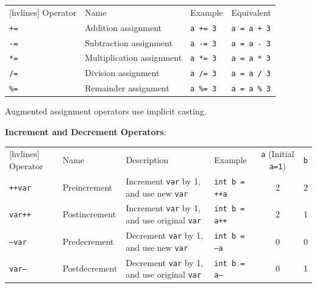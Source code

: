 \documentclass{article}
\begin{document}
\begin{table}[h]
	\centering
	\begin{NiceTabular}{||llll||}[hvlines]
		\RowStyle{\bfseries}Operator & Name & Example & Equivalent\\
		\texttt{+=} & Addition assignment & \texttt{a += 3} & \texttt{a = a + 3}\\
		\texttt{-=} & Subtraction assignment & \texttt{a -= 3} & \texttt{a = a - 3}\\
		\texttt{*=} & Multiplication assignment & \texttt{a *= 3} & \texttt{a = a * 3}\\
		\texttt{/=} & Division assignment & \texttt{a /= 3} & \texttt{a = a / 3}\\
		\texttt{\%=} & Remainder assignment & \texttt{a \%= 3} & \texttt{a = a \% 3}
	\end{NiceTabular}
\end{table}
Augmented assignment operators use implicit casting.
\newpage

\textbf{Increment and Decrement Operators}:

\begin{table}[h]
	\centering
	\begin{NiceTabular}{||llllcc||}[hvlines]
		\RowStyle{\bfseries} Operator & Name & Description & Example & \texttt{a} (Initial \texttt{a=1}) & \texttt{b}\\
		\texttt{++var} & Preincrement & Increment \texttt{var} by 1, and use new \texttt{var} & \texttt{int b = ++a} & 2 & 2\\
		\texttt{var++} & Postincrement & Increment \texttt{var} by 1, and use original \texttt{var} & \texttt{int b = a++} & 2 & 1\\
		\texttt{--var} & Predecrement & Decrement \texttt{var} by 1, and use new \texttt{var} & \texttt{int b = --a} & 0 & 0\\
		\texttt{var--} & Postdecrement & Decrement \texttt{var} by 1, and use original \texttt{var} & \texttt{int b = a--} & 0 & 1
	\end{NiceTabular}
\end{table}
\end{document}
